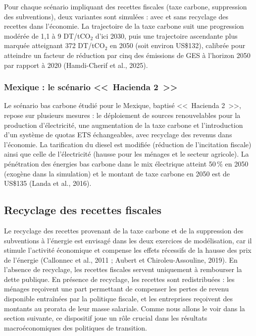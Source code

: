 \documentclass[12pt, a4paper]{article}
\begin{document}
Pour chaque scénario impliquant des recettes fiscales (taxe carbone, suppression des subventions), deux variantes sont simulées : avec et sans recyclage des recettes dans l'économie. La trajectoire de la taxe carbone suit une progression modérée de 1,1 à 9 DT/tCO$_2$ d'ici 2030, puis une trajectoire ascendante plus marquée atteignant 372 DT/tCO$_2$ en 2050 (soit environ US\$132), calibrée pour atteindre un facteur de réduction par cinq des émissions de GES à l'horizon 2050 par rapport à 2020 (Hamdi-Cherif et al., 2025).

\subsubsection{Mexique : le scénario <<~Hacienda 2~>>}

Le scénario bas carbone étudié pour le Mexique, baptisé <<~Hacienda 2~>>, repose sur plusieurs mesures : le déploiement de sources renouvelables pour la production d'électricité, une augmentation de la taxe carbone et l'introduction d'un système de quotas ETS échangeables, avec recyclage des revenus dans l'économie. La tarification du diesel est modifiée (réduction de l'incitation fiscale) ainsi que celle de l'électricité (hausse pour les ménages et le secteur agricole). La pénétration des énergies bas carbone dans le mix électrique atteint 50\,\% en 2050 (exogène dans la simulation) et le montant de taxe carbone en 2050 est de US\$135 (Landa et al., 2016).

\subsection{Recyclage des recettes fiscales}
\label{subsec:recyclage_mecanisme}

Le recyclage des recettes provenant de la taxe carbone et de la suppression des subventions à l'énergie est envisagé dans les deux exercices de modélisation, car il stimule l'activité économique et compense les effets récessifs de la hausse des prix de l'énergie (Callonnec et al., 2011 ; Aubert et Chiroleu-Assouline, 2019). En l'absence de recyclage, les recettes fiscales servent uniquement à rembourser la dette publique. En présence de recyclage, les recettes sont redistribuées : les ménages reçoivent une part permettant de compenser les pertes de revenu disponible entraînées par la politique fiscale, et les entreprises reçoivent des montants au prorata de leur masse salariale. Comme nous allons le voir dans la section suivante, ce dispositif joue un rôle crucial dans les résultats macroéconomiques des politiques de transition.
\end{document}
